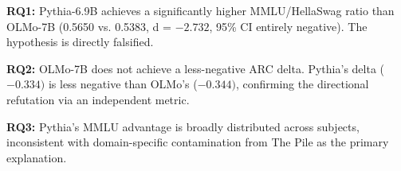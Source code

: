 \textbf{RQ1:} Pythia-6.9B achieves a significantly higher MMLU/HellaSwag ratio than OLMo-7B (0.5650 vs. 0.5383, d = $-2.732$, 95\% CI entirely negative). The hypothesis is directly falsified.

\textbf{RQ2:} OLMo-7B does not achieve a less-negative ARC delta. Pythia's delta ($-0.334)$ is less negative than OLMo's ($-0.344)$, confirming the directional refutation via an independent metric.

\textbf{RQ3:} Pythia's MMLU advantage is broadly distributed across subjects, inconsistent with domain-specific contamination from The Pile as the primary explanation.

